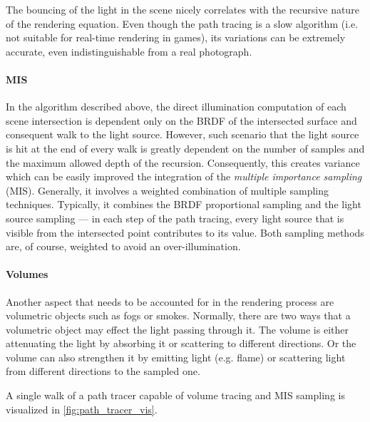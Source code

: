 The bouncing of the light in the scene nicely correlates with the recursive nature of the rendering equation. Even though the path tracing is a slow algorithm (i.e. not suitable for real-time rendering in games), its variations can be extremely accurate, even indistinguishable from a real photograph. 


\paragraph{MIS}

In the algorithm described above, the direct illumination computation of each scene intersection is dependent only on the BRDF of the intersected surface and consequent walk to the light source. However, such scenario that the light source is hit at the end of every walk is greatly dependent on the number of samples and the maximum allowed depth of the recursion. Consequently, this creates variance which can be easily improved the integration of the \emph{multiple importance sampling} (MIS). Generally, it involves a weighted combination of multiple sampling techniques. Typically, it combines the BRDF proportional sampling and the light source sampling --- in each step of the path tracing, every light source that is visible from the intersected point contributes to its value. Both sampling methods are, of course, weighted to avoid an over-illumination. 

\paragraph{Volumes}

Another aspect that needs to be accounted for in the rendering process are volumetric objects such as fogs or smokes. Normally, there are two ways that a volumetric object may effect the light passing through it. The volume is either attenuating the light by absorbing it or scattering to different directions. Or the volume can also strengthen it by emitting light (e.g. flame) or scattering light from different directions to the sampled one.

A single walk of a path tracer capable of volume tracing and MIS sampling is visualized in \autoref{fig:path_tracer_vis}.

